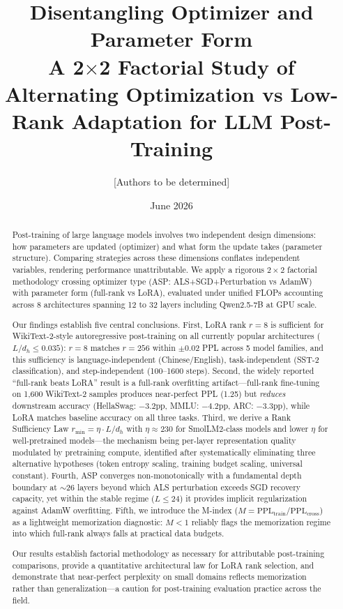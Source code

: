 \documentclass[11pt]{article}
\title{\textbf{Disentangling Optimizer and Parameter Form}\\[4pt]
\large A 2$\times$2 Factorial Study of Alternating Optimization vs Low-Rank Adaptation for LLM Post-Training}
\author{[Authors to be determined]}
\date{June 2026}
\begin{document}
\maketitle

\begin{abstract}
Post-training of large language models involves two independent design dimensions: how parameters are updated (optimizer) and what form the update takes (parameter structure). Comparing strategies across these dimensions conflates independent variables, rendering performance unattributable. We apply a rigorous $2\times 2$ factorial methodology crossing optimizer type (ASP: ALS+SGD+Perturbation vs AdamW) with parameter form (full-rank vs LoRA), evaluated under unified FLOPs accounting across 8 architectures spanning 12 to 32 layers including Qwen2.5-7B at GPU scale.

Our findings establish five central conclusions. First, LoRA rank $r=8$ is sufficient for WikiText-2-style autoregressive post-training on all currently popular architectures ($L/d_h \leq 0.035$): $r=8$ matches $r=256$ within $\pm 0.02$ PPL across 5 model families, and this sufficiency is language-independent (Chinese/English), task-independent (SST-2 classification), and step-independent (100--1600 steps). Second, the widely reported ``full-rank beats LoRA'' result is a full-rank overfitting artifact---full-rank fine-tuning on 1,600 WikiText-2 samples produces near-perfect PPL (1.25) but \textit{reduces} downstream accuracy (HellaSwag: $-3.2$pp, MMLU: $-4.2$pp, ARC: $-3.3$pp), while LoRA matches baseline accuracy on all three tasks. Third, we derive a Rank Sufficiency Law $r_{\min} = \eta \cdot L/d_h$ with $\eta \approx 230$ for SmolLM2-class models and lower $\eta$ for well-pretrained models---the mechanism being per-layer representation quality modulated by pretraining compute, identified after systematically eliminating three alternative hypotheses (token entropy scaling, training budget scaling, universal constant). Fourth, ASP converges non-monotonically with a fundamental depth boundary at $\sim$26 layers beyond which ALS perturbation exceeds SGD recovery capacity, yet within the stable regime ($L \leq 24$) it provides implicit regularization against AdamW overfitting. Fifth, we introduce the M-index ($M = \text{PPL}_{\text{train}}/\text{PPL}_{\text{cross}}$) as a lightweight memorization diagnostic: $M < 1$ reliably flags the memorization regime into which full-rank always falls at practical data budgets.

Our results establish factorial methodology as necessary for attributable post-training comparisons, provide a quantitative architectural law for LoRA rank selection, and demonstrate that near-perfect perplexity on small domains reflects memorization rather than generalization---a caution for post-training evaluation practice across the field.
\end{abstract}
\end{document}

